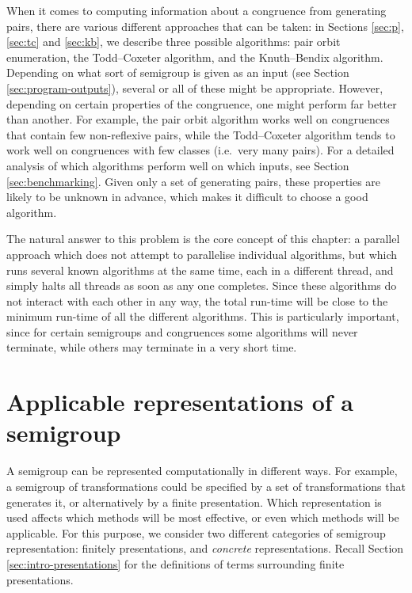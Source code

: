 When it comes to computing information about a congruence from generating pairs,
there are various different approaches that can be taken: in Sections
\ref{sec:p}, \ref{sec:tc} and \ref{sec:kb}, we describe three possible
algorithms: pair orbit enumeration, the Todd--Coxeter algorithm, and the Knuth--Bendix algorithm.
Depending on what sort of semigroup is given as an input (see Section
\ref{sec:program-outputs}), several
or all of these might be appropriate.  However, depending on certain properties
of the congruence, one might perform far better than another.  For example, the
pair orbit algorithm works well on congruences that contain few non-reflexive
pairs, while the Todd--Coxeter algorithm tends to work well on congruences with
few classes (i.e.~very many pairs).  For a detailed analysis of which algorithms
perform well on which inputs, see Section \ref{sec:benchmarking}.  Given
only a set of generating pairs, these properties are likely to be unknown in
advance, which makes it difficult to choose a good algorithm.

The natural answer to this problem is the core concept of this chapter: a
parallel approach which does not attempt to parallelise individual algorithms,
but which runs several known algorithms at the same time, each in a different
thread, and simply halts all threads as soon as any one completes.  Since these
algorithms do not interact with each other in any way, the total run-time will
be close to the minimum run-time of all the different algorithms.  This is
particularly important, since for certain semigroups and congruences some
algorithms will never terminate, while others may terminate in a very short
time.

\section{Applicable representations of a semigroup}
\label{sec:applicable-representations-of-a-semigroup}

A semigroup can be represented computationally in different ways.  For example,
a semigroup of transformations could be specified by a set of transformations
that generates it, or alternatively by a finite presentation.
Which representation is used affects which methods will be most effective,
or even which methods will be applicable.  For this purpose, we consider two
different categories of semigroup representation: finitely presentations, and
\textit{concrete} representations.  Recall Section \ref{sec:intro-presentations} for
the definitions of terms surrounding finite presentations.

